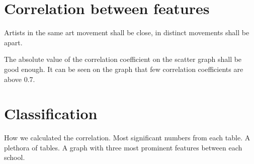 \documentclass[11pt,a4paper,draft]{report}
\begin{document}



\begin{multicols}{2}

\section{Correlation between features}

Artists in the same art movement shall be close, in distinct movements shall be
apart.

The absolute value of the correlation coefficient on the scatter graph shall be
good enough.  It can be seen on the graph that few correlation coefficients are
above 0.7.

\section{Classification}

How we calculated the correlation.  Most significant numbers from each table.
A plethora of tables.  A graph with three most prominent features between each
school.


\end{multicols}
\end{document}
